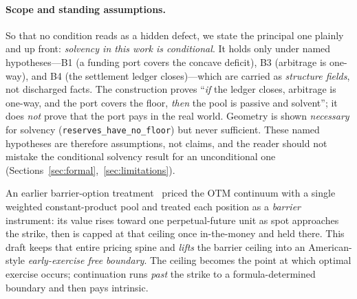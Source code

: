 \documentclass[runningheads]{llncs}
\begin{document}
\paragraph{Scope and standing assumptions.}
So that no condition reads as a hidden defect, we state the principal one plainly
and up front: \emph{solvency in this work is conditional}. It holds only under
named hypotheses---B1 (a funding port covers the concave deficit), B3 (arbitrage
is one-way), and B4 (the settlement ledger closes)---which are carried as
\emph{structure fields}, not discharged facts. The construction proves ``\emph{if}
the ledger closes, arbitrage is one-way, and the port covers the floor, \emph{then}
the pool is passive and solvent''; it does \emph{not} prove that the port pays in
the real world. Geometry is shown \emph{necessary} for solvency
(\texttt{reserves\_have\_no\_floor}) but never sufficient. These named hypotheses
are therefore assumptions, not claims, and the reader should not mistake the
conditional solvency result for an unconditional one
(Sections~\ref{sec:formal},~\ref{sec:limitations}).

An earlier barrier-option treatment~\cite{temporal-barrier} priced the OTM continuum
with a single weighted constant-product pool and treated each position as a
\emph{barrier} instrument: its value rises toward one perpetual-future unit as
spot approaches the strike, then is capped at that ceiling once in-the-money and
held there. This draft keeps that entire pricing spine and \emph{lifts} the
barrier ceiling into an American-style \emph{early-exercise free boundary}. The
ceiling becomes the point at which optimal exercise occurs; continuation runs
\emph{past} the strike to a formula-determined boundary and then pays intrinsic.
\end{document}
